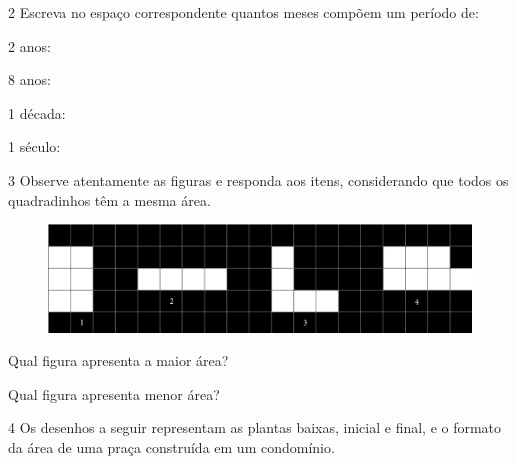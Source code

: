 \num{2} Escreva no espaço correspondente quantos meses compõem um período de:

\begin{escolha}
\item
  2 anos:

\item
  8 anos:

\item
  1 década:

\item
  1 século:
\end{escolha}


\num{3} Observe atentamente as figuras e responda aos itens, considerando que todos os quadradinhos têm a mesma área.

\begin{figure}[htpb!]
\centering
\includegraphics[width=\textwidth]{media/image31.png}
\end{figure}

\begin{escolha}
\item Qual figura apresenta a maior área?\\

\item Qual figura apresenta menor área? \\
\end{escolha}


\num{4} Os desenhos a seguir representam as plantas baixas, inicial
e final, e o formato da área de uma praça construída em um condomínio. 

